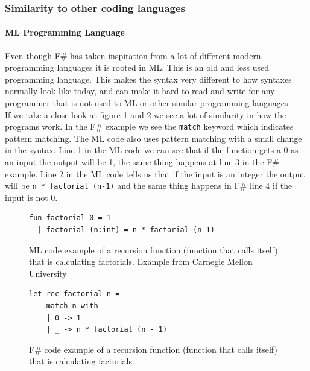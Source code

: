\documentclass[12pt, a4paper]{article}
\newcommand{\code}[1]{{\small \texttt{#1}}}
\begin{document}
\newpage
\subsubsection{Similarity to other coding languages}

\paragraph{ML Programming Language}

Even though F\# has taken inspiration from a lot of different modern programming languages it is rooted in ML. This is an old and less used programming language. This makes the syntax very different to how syntaxes normally look like today, and can make it hard to read and write for any programmer that is not used to ML or other similar programming languages.\\

If we take a close look at figure \ref{fig:factorialMLExample} and \ref{fig:factorialFsharpExample} we see a lot of similarity in how the programs work. In the F\# example we see the \code{match} keyword which indicates pattern matching. The ML code also uses pattern matching with a small change in the syntax. Line 1 in the ML code we can see that if the function gets a 0 as an input the output will be 1, the same thing happens at line 3 in the F\# example. Line 2 in the ML code tells us that if the input is an integer the output will be \code{n * factorial (n-1)} and the same thing happens in F\# line 4 if the input is not 0.\\

\begin{figure}[!h]
	\begin{lstlisting}
fun factorial 0 = 1
  | factorial (n:int) = n * factorial (n-1)
	\end{lstlisting}
	\caption{ML code example of a recursion function (function that calls itself) that is calculating factorials. Example from Carnegie Mellon University\cite{carnegieMellon}}
	\label{fig:factorialMLExample}
\end{figure}

\begin{figure}[!h]
	\begin{lstlisting}
let rec factorial n =
    match n with
    | 0 -> 1
    | _ -> n * factorial (n - 1)
	\end{lstlisting}
	\caption{F\# code example of a recursion function (function that calls itself) that is calculating factorials.}
	\label{fig:factorialFsharpExample}
\end{figure}
\end{document}
